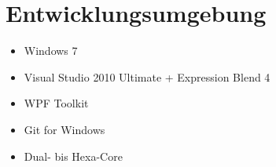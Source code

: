 \section{Entwicklungsumgebung}

\begin{itemize}
	\item Windows 7
	\item Visual Studio 2010 Ultimate + Expression Blend 4
	\item WPF Toolkit
	\item Git for Windows
	\item Dual- bis Hexa-Core
\end{itemize}
